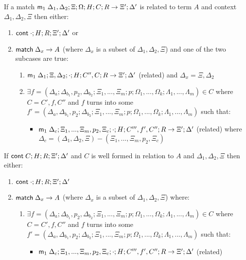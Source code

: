 \begin{theorem}

If a match $\mathsf{m}_1 \; \Delta_1, \Delta_2; \Xi; \Omega; H; C; R \rightarrow \Xi'; \Delta'$ is related to term $A$ and context $\Delta_1, \Delta_2, \Xi$ then either:\\
\begin{enumerate}
   \item $\mathsf{cont} \; \cdot; H; R; \Xi'; \Delta'$ or
   \item $\mathsf{match} \; \Delta_x \rightarrow A$ (where $\Delta_x$ is a subset of $\Delta_1, \Delta_2, \Xi$) and one of the two subcases are true:
      \begin{enumerate}
         \item $\mathsf{m}_1 \; \Delta_1; \Xi, \Delta_2; \cdot; H; C'', C; R \rightarrow \Xi'; \Delta'$ (related) and $\Delta_x = \Xi, \Delta_2$
         \item $\exists f = (\Delta_a; \Delta_{b_1}, p_2, \Delta_{b_2}; \Xi_1, ..., \Xi_m; p; \Omega_1, ..., \Omega_k; \Lambda_1, ..., \Lambda_m) \in C$ where $C = C', f, C''$ and $f$ turns into some $f' = (\Delta_a, \Delta_{b_1}, p_2; \Delta_{b_2}; \Xi_1, ..., \Xi_m; p; \Omega_1, ..., \Omega_k; \Lambda_1, ..., \Lambda_m)$ such that:
            \begin{itemize}
               \item $\mathsf{m}_1 \; \Delta_c; \Xi_1, ..., \Xi_m, p_2, \Xi_c; \cdot; H; C''', f', C''; R \rightarrow \Xi'; \Delta'$ (related) where $\Delta_c = (\Delta_1, \Delta_2, \Xi) - (\Xi_1, ..., \Xi_m, p_2, \Xi_c)$
            \end{itemize}
      \end{enumerate}
\end{enumerate}

If $\mathsf{cont} \; C; H; R; \Xi'; \Delta'$ and $C$ is well formed in relation to $A$ and $\Delta_1, \Delta_2, \Xi$ then either:\\
\begin{enumerate}
   \item $\mathsf{cont} \; \cdot; H; R; \Xi'; \Delta'$
   \item $\mathsf{match} \; \Delta_x \rightarrow A$ (where $\Delta_x$ is a subset of $\Delta_1, \Delta_2, \Xi$) where:
   \begin{enumerate}
      \item $\exists f = (\Delta_a; \Delta_{b_1}, p_2, \Delta_{b_2}; \Xi_1, ..., \Xi_m; p; \Omega_1, ..., \Omega_k; \Lambda_1, ..., \Lambda_m) \in C$ where $C = C', f, C''$ and $f$ turns into some $f' = (\Delta_a, \Delta_{b_1}, p_2; \Delta_{b_2}; \Xi_1, ..., \Xi_m; p; \Omega_1, ..., \Omega_k; \Lambda_1, ..., \Lambda_m)$ such that:
         \begin{itemize}
            \item $\mathsf{m}_1 \; \Delta_c; \Xi_1, ..., \Xi_m, p_2, \Xi_c; \cdot; H; C''', f', C''; R \rightarrow \Xi'; \Delta'$ (related)
         \end{itemize}
   \end{enumerate}
\end{enumerate}

\end{theorem}

